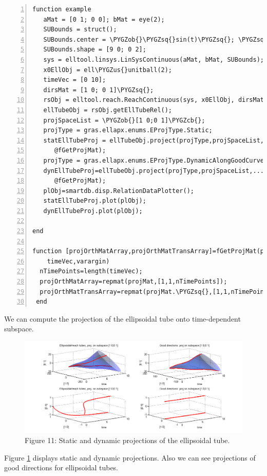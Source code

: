 \documentclass[letterpaper,10pt,english]{sphinxmanual}
\def\PYGZus{\char`\_}
\def\PYGZob{\char`\{}
\def\PYGZcb{\char`\}}
\def\PYGZsq{\char`\'}
\begin{document}
\begin{Verbatim}[commandchars=\\\{\},numbers=left,firstnumber=1,stepnumber=1]
function example
   aMat = [0 1; 0 0]; bMat = eye(2);  
   SUBounds = struct();
   SUBounds.center = \PYGZob{}\PYGZsq{}sin(t)\PYGZsq{}; \PYGZsq{}cos(t)\PYGZsq{}\PYGZcb{};  
   SUBounds.shape = [9 0; 0 2]; 
   sys = elltool.linsys.LinSysContinuous(aMat, bMat, SUBounds);
   x0EllObj = ell\PYGZus{}unitball(2);
   timeVec = [0 10]; 
   dirsMat = [1 0; 0 1]\PYGZsq{};  
   rsObj = elltool.reach.ReachContinuous(sys, x0EllObj, dirsMat, timeVec);
   ellTubeObj = rsObj.getEllTubeRel();
   projSpaceList = \PYGZob{}[1 0;0 1]\PYGZcb{};
   projType = gras.ellapx.enums.EProjType.Static;
   statEllTubeProj = ellTubeObj.project(projType,projSpaceList,...
      @fGetProjMat);
   projType = gras.ellapx.enums.EProjType.DynamicAlongGoodCurve;
   dynEllTubeProj=ellTubeObj.project(projType,projSpaceList,...
      @fGetProjMat);
   plObj=smartdb.disp.RelationDataPlotter();
   statEllTubeProj.plot(plObj);
   dynEllTubeProj.plot(plObj);

end

function [projOrthMatArray,projOrthMatTransArray]=fGetProjMat(projMat,...
    timeVec,varargin)
  nTimePoints=length(timeVec);
  projOrthMatArray=repmat(projMat,[1,1,nTimePoints]);
  projOrthMatTransArray=repmat(projMat.\PYGZsq{},[1,1,nTimePoints]);
 end
\end{Verbatim}
\label{chap_implement:goto-label}
We can compute the projection of the ellipsoidal
tube onto time-dependent subspace.
\begin{figure}[htbp]
\centering
\capstart

\includegraphics[width=1.000\linewidth]{chapter05_section03_reachTubeStatProjreachTubeDynProj.png}
\caption{Figure 11: Static and dynamic projections of the ellipsoidal tube.}\label{chap_implement:statdyn-proj}\end{figure}

Figure \hyperref[chap_implement:statdyn-proj]{ \ref*{chap_implement:statdyn-proj}} displays static and dynamic projections.
Also we can see projections of good directions for ellipsoidal tubes.
\end{document}
